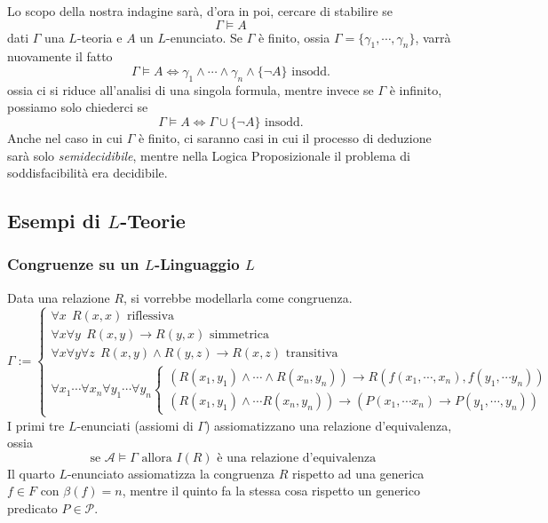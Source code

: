 \noindent
Lo scopo della nostra indagine sarà, d'ora in poi, cercare di stabilire se
$$
\Gamma \models A
$$
dati $\Gamma$  una $L$-teoria e $A$ un $L$-enunciato. 
Se $\Gamma$ è finito, ossia $\Gamma = \{\gamma_1, \cdots, \gamma_n\}$, 
varrà nuovamente il fatto 
$$
\Gamma \models A \iff \gamma_1 \land \cdots \land \gamma_n \land  \{\neg A\} \text{ insodd.}
$$
ossia ci si riduce all'analisi di una singola formula, 
mentre invece se $\Gamma$ è infinito, possiamo solo chiederci se
$$
\Gamma \models A \iff \Gamma \cup \{\neg A\} \text{ insodd.}
$$
Anche nel caso in cui $\Gamma$ è finito, ci saranno casi in cui il processo 
di deduzione sarà solo \textit{semidecidibile}, mentre nella Logica Proposizionale 
il problema di soddisfacibilità era decidibile. 
\subsection{Esempi di $L$-Teorie} 

\subsubsection{Congruenze su un $L$-Linguaggio $L$}
Data una relazione $R$, si vorrebbe modellarla come congruenza.
$$
\Gamma := 
\begin{cases}
        \forall x ~~ R(x,x) \text{ riflessiva } \\
        \forall x \forall y ~~ R(x,y) \rightarrow R(y,x)  \text{ simmetrica } \\
        \forall x \forall y \forall z ~~ R(x,y) \land R(y,z) \rightarrow R(x,z)  \text{ transitiva }\\

        \forall x_1 \cdots \forall x_n \forall y_1 \cdots \forall y_n 
        \begin{cases}
        (R(x_1,y_1) \land \cdots \land R(x_n,y_n)) \rightarrow R(f(x_1, \cdots, x_n), f(y_1, \cdots y_n)) \\
        (R(x_1, y_1) \land \cdots R(x_n, y_n)) \rightarrow (P(x_1, \cdots x_n) \rightarrow P(y_1, \cdots, y_n))
        \end{cases}

\end{cases}
$$
I primi tre $L$-enunciati (assiomi di $\Gamma$) assiomatizzano una 
relazione d'equivalenza, ossia
$$
\text{ se }\mathcal{A} \models \Gamma \text{ allora } I(R) \text{ è una relazione d'equivalenza}
$$
Il quarto $L$-enunciato assiomatizza la congruenza $R$ rispetto ad
una generica $f \in F$ con $\beta(f) = n$, mentre il quinto fa 
la stessa cosa rispetto un generico predicato $P \in \mathcal{P}$. 


